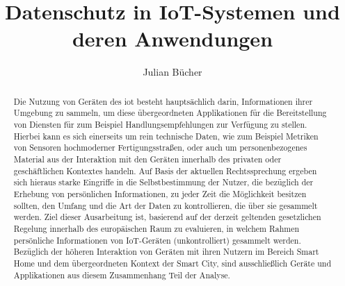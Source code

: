 \documentclass[runningheads]{llncs}
\begin{document}

\title{Datenschutz in IoT-Systemen und deren Anwendungen}
%
%
\author{Julian Bücher}
%
%
%
\maketitle              %


\begin{abstract}
Die Nutzung von Geräten des \ac{iot} besteht hauptsächlich darin, Informationen ihrer Umgebung zu sammeln, um diese übergeordneten Applikationen für die Bereitstellung von Diensten für zum Beispiel Handlungsempfehlungen zur Verfügung zu stellen. Hierbei kann es sich einerseits um rein technische Daten, wie zum Beispiel Metriken von Sensoren hochmoderner Fertigungsstraßen, oder auch um personenbezogenes Material aus der Interaktion mit den Geräten innerhalb des privaten oder geschäftlichen Kontextes handeln. Auf Basis der aktuellen Rechtssprechung ergeben sich hieraus starke Eingriffe in die Selbstbestimmung der Nutzer, die bezüglich der Erhebung von persönlichen Informationen, zu jeder Zeit die Möglichkeit besitzen sollten, den Umfang und die Art der Daten zu kontrollieren, die über sie gesammelt werden. Ziel dieser Ausarbeitung ist, basierend auf der derzeit geltenden gesetzlichen Regelung innerhalb des europäischen Raum zu evaluieren, in welchem Rahmen persönliche Informationen von IoT-Geräten (unkontrolliert) gesammelt werden. Bezüglich der höheren Interaktion von Geräten mit ihren Nutzern im Bereich Smart Home und dem übergeordneten Kontext der Smart City, sind ausschließlich Geräte und Applikationen aus diesem Zusammenhang Teil der Analyse.

\end{abstract}
\end{document}
